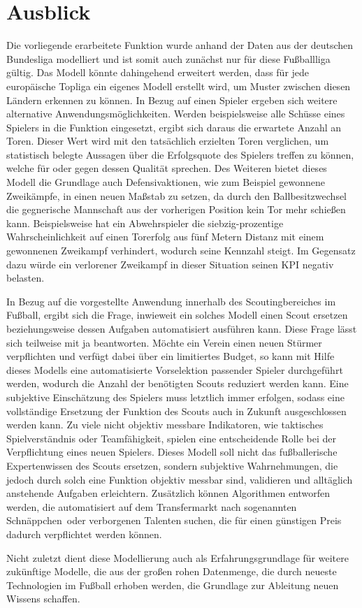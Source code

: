 \section{Ausblick}
\label{ausblick}

Die vorliegende erarbeitete Funktion wurde anhand der Daten aus der deutschen Bundesliga modelliert und ist somit auch zunächst nur für diese Fußballliga gültig. Das Modell könnte dahingehend erweitert werden, dass für jede europäische Topliga ein eigenes Modell erstellt wird, um Muster zwischen diesen Ländern erkennen zu können. In Bezug auf einen Spieler ergeben sich weitere alternative Anwendungsmöglichkeiten. Werden beispielsweise alle Schüsse eines Spielers in die Funktion eingesetzt, ergibt sich daraus die erwartete Anzahl an Toren. Dieser Wert wird mit den tatsächlich erzielten Toren verglichen, um statistisch belegte Aussagen über die Erfolgsquote des Spielers treffen zu können, welche für oder gegen dessen Qualität sprechen. Des Weiteren bietet dieses Modell die Grundlage auch Defensivaktionen, wie zum Beispiel gewonnene Zweikämpfe, in einen neuen Maßstab zu setzen, da durch den Ballbesitzwechsel die gegnerische Mannschaft aus der vorherigen Position kein Tor mehr schießen kann. Beispielsweise hat ein Abwehrspieler die siebzig-prozentige Wahrscheinlichkeit auf einen Torerfolg aus fünf Metern Distanz mit einem gewonnenen Zweikampf verhindert, wodurch seine Kennzahl steigt. Im Gegensatz dazu würde ein verlorener Zweikampf in dieser Situation seinen KPI negativ belasten.

In Bezug auf die vorgestellte Anwendung innerhalb des Scoutingbereiches im Fußball, ergibt sich die Frage, inwieweit ein solches Modell einen Scout ersetzen beziehungsweise dessen Aufgaben automatisiert ausführen kann. Diese Frage lässt sich teilweise mit ja beantworten. Möchte ein Verein einen neuen Stürmer verpflichten und verfügt dabei über ein limitiertes Budget, so kann mit Hilfe dieses Modells eine automatisierte Vorselektion passender Spieler durchgeführt werden, wodurch die Anzahl der benötigten Scouts reduziert werden kann. Eine subjektive Einschätzung des Spielers muss letztlich immer erfolgen, sodass eine vollständige Ersetzung der Funktion des Scouts auch in Zukunft ausgeschlossen werden kann. Zu viele nicht objektiv messbare Indikatoren, wie taktisches Spielverständnis oder Teamfähigkeit, spielen eine entscheidende Rolle bei der Verpflichtung eines neuen Spielers. Dieses Modell soll nicht das fußballerische Expertenwissen des Scouts ersetzen, sondern subjektive Wahrnehmungen, die jedoch durch solch eine Funktion objektiv messbar sind, validieren und alltäglich anstehende Aufgaben erleichtern. Zusätzlich können Algorithmen entworfen werden, die automatisiert auf dem Transfermarkt nach sogenannten \glqq Schnäppchen\grqq~oder verborgenen Talenten suchen, die für einen günstigen Preis dadurch verpflichtet werden können. 

\enlargethispage{\baselineskip}Nicht zuletzt dient diese Modellierung auch als Erfahrungsgrundlage für weitere zukünftige Modelle, die aus der großen rohen Datenmenge, die durch neueste Technologien im Fußball erhoben werden, die Grundlage zur Ableitung neuen Wissens schaffen.